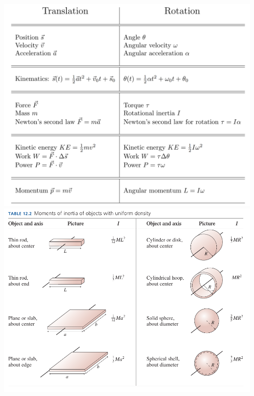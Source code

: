 \documentclass[12pt]{article}
\begin{document}
\begin{landscape}
	\begin{center}
	\includegraphics[width=6in]{correspondence-table.png}
	\includegraphics[width=6in]{moment-table.png}
	\end{center}

\end{landscape}
\end{document}
